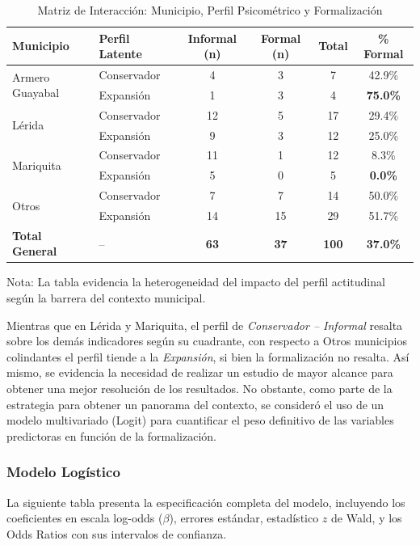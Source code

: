 \documentclass[11pt,a4paper]{article}
\begin{document}
\begin{table}[H]
\centering
\caption{Matriz de Interacci\'on: Municipio, Perfil Psicom\'etrico y Formalizaci\'on}
\label{tab:interaccion_tripartita}
\small
\begin{tabular}{@{}llcccc@{}}
\toprule
\textbf{Municipio} & \textbf{Perfil Latente} & \textbf{Informal (n)} & \textbf{Formal (n)} & \textbf{Total} & \textbf{\% Formal} \\ \midrule
\multirow{2}{*}{Armero Guayabal} & Conservador & 4 & 3 & 7 & 42.9\% \\
 & Expansi\'on & 1 & 3 & 4 & \textbf{75.0\%} \\ \midrule
\multirow{2}{*}{L\'erida} & Conservador & 12 & 5 & 17 & 29.4\% \\
 & Expansi\'on & 9 & 3 & 12 & 25.0\% \\ \midrule
\multirow{2}{*}{Mariquita} & Conservador & 11 & 1 & 12 & 8.3\% \\
 & Expansi\'on & 5 & 0 & 5 & \textbf{0.0\%} \\ \midrule
\multirow{2}{*}{Otros} & Conservador & 7 & 7 & 14 & 50.0\% \\
 & Expansi\'on & 14 & 15 & 29 & 51.7\% \\ \midrule
\textbf{Total General} & -- & \textbf{63} & \textbf{37} & \textbf{100} & \textbf{37.0\%} \\ \bottomrule
\end{tabular}
\par\smallskip
\footnotesize{Nota: La tabla evidencia la heterogeneidad del impacto del perfil actitudinal según la barrera del contexto municipal.}
\end{table}

\par
Mientras que en Lérida y Mariquita, el perfil de \textit{Conservador -- Informal} resalta sobre los demás indicadores según su cuadrante, con respecto a Otros municipios colindantes el perfil tiende a la \textit{Expansión}, si bien la formalización no resalta. Así mismo, se evidencia la necesidad de realizar un estudio de mayor alcance para obtener una mejor resolución de los resultados. No obstante, como parte de la estrategia para obtener un panorama del contexto, se consideró el uso de un modelo multivariado (Logit) para cuantificar el peso definitivo de las variables predictoras en función de la formalización.

\subsubsection{Modelo Log\'istico}
La siguiente tabla presenta la especificación completa del modelo, incluyendo los coeficientes en escala log-odds ($\beta$), errores estándar, estadístico $z$ de Wald, y los Odds Ratios con sus intervalos de confianza.
\end{document}
